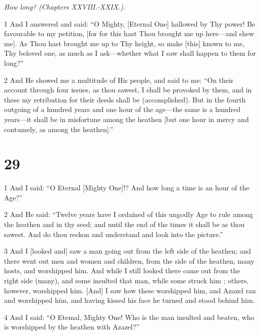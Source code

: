\par \textit{How long? (Chapters XXVIII.-XXIX.).}

\par 1 And I answered and said: “O Mighty, [Eternal One] hallowed by Thy power! Be favourable to my petition, [for for this hast Thou brought me up here—and shew me]. As Thou hast brought me up to Thy height, so make [this] known to me, Thy beloved one, as much as I ask—whether what I saw shall happen to them for long?”

\par 2 And He showed me a multitude of His people, and said to me: “On their account through four issues, as thou sawest, I shall be provoked by them, and in these my retribution for their deeds shall be (accomplished). But in the fourth outgoing of a hundred years and one hour of the age—the same is a hundred years—it shall be in misfortune among the heathen [but one hour in mercy and contumely, as among the heathen].”

\chapter{29}

\par 1 And I said: “O Eternal [Mighty One]!? And how long a time is an hour of the Age?”

\par 2 And He said: “Twelve years have I ordained of this ungodly Age to rule among the heathen and in thy seed; and until the end of the times it shall be as thou sawest. And do thou reckon and understand and look into the picture.”

\par 3 And I [looked and] saw a man going out from the left side of the heathen; and there went out men and women and children, from the side of the heathen, many hosts, and worshipped him. And while I still looked there came out from the right side (many), and some insulted that man, while some struck him ; others, however, worshipped him. [And] I saw how these worshipped him, and Azazel ran and worshipped him, and having kissed his face he turned and stood behind him. 

\par 4 And I said: “O Etemal, Mighty One! Who is the man insulted and beaten, who is worshipped by the heathen with Azazel?”

